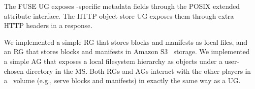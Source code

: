 The FUSE UG exposes \Syndicate-specific metadata fields through the POSIX extended attribute interface. The HTTP object store UG exposes them through extra HTTP headers in a response.

We implemented a simple RG that stores blocks and manifests as local files, and an RG that stores blocks and manifests in Amazon S3~\cite{S3} storage. We implemented a simple AG that exposes a local filesystem hierarchy as objects under a user-chosen directory in the MS. Both RGs and AGs interact with the other players in a \Syndicate\ volume (e.g., serve blocks and manifests) in exactly the same way as a UG.
